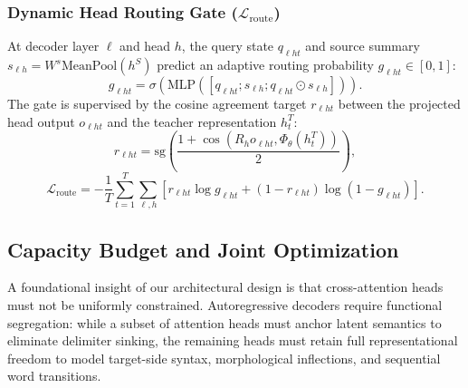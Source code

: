 \documentclass[11pt]{article}
\begin{document}
\subsubsection{Dynamic Head Routing Gate ($\mathcal{L}_{\text{route}}$)}
At decoder layer $\ell$ and head $h$, the query state $q_{\ell h t}$ and source summary $s_{\ell h} = W^s \text{MeanPool}(h^S)$ predict an adaptive routing probability $g_{\ell h t} \in [0, 1]$:
\begin{equation}
    g_{\ell h t} = \sigma\left(\text{MLP}\left([q_{\ell h t}; s_{\ell h}; q_{\ell h t} \odot s_{\ell h}]\right)\right).
    \label{eq:gate_prob}
\end{equation}
The gate is supervised by the cosine agreement target $r_{\ell h t}$ between the projected head output $o_{\ell h t}$ and the teacher representation $h_t^T$:
\begin{equation}
    r_{\ell h t} = \text{sg}\left(\frac{1 + \cos(R_h o_{\ell h t}, \Phi_\theta(h_t^T))}{2}\right),
    \label{eq:agreement_target}
\end{equation}
\begin{equation}
    \mathcal{L}_{\text{route}} = -\frac{1}{T} \sum_{t=1}^T \sum_{\ell, h} \left[ r_{\ell h t} \log g_{\ell h t} + (1 - r_{\ell h t}) \log (1 - g_{\ell h t}) \right].
    \label{eq:loss_route}
\end{equation}

\subsection{Capacity Budget and Joint Optimization}
\label{sec:capacity_budget}
A foundational insight of our architectural design is that cross-attention heads must not be uniformly constrained. Autoregressive decoders require functional segregation: while a subset of attention heads must anchor latent semantics to eliminate delimiter sinking, the remaining heads must retain full representational freedom to model target-side syntax, morphological inflections, and sequential word transitions. 
\end{document}
